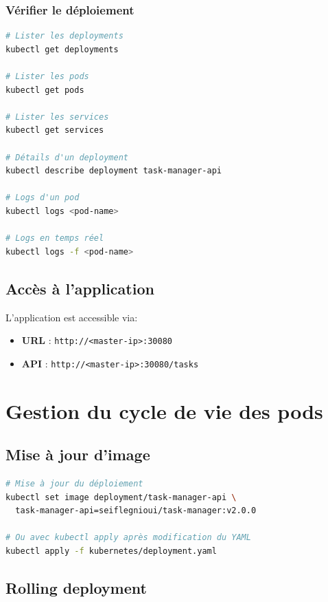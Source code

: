 \documentclass[12pt,a4paper,twoside]{report}
\begin{document}
\subsubsection{Vérifier le déploiement}

\begin{lstlisting}[language=bash]
# Lister les deployments
kubectl get deployments

# Lister les pods
kubectl get pods

# Lister les services
kubectl get services

# Détails d'un deployment
kubectl describe deployment task-manager-api

# Logs d'un pod
kubectl logs <pod-name>

# Logs en temps réel
kubectl logs -f <pod-name>
\end{lstlisting}

\subsection{Accès à l'application}

L'application est accessible via:
\begin{itemize}
    \item \textbf{URL} : \texttt{http://<master-ip>:30080}
    \item \textbf{API} : \texttt{http://<master-ip>:30080/tasks}
\end{itemize}

\section{Gestion du cycle de vie des pods}

\subsection{Mise à jour d'image}

\begin{lstlisting}[language=bash]
# Mise à jour du déploiement
kubectl set image deployment/task-manager-api \
  task-manager-api=seiflegnioui/task-manager:v2.0.0

# Ou avec kubectl apply après modification du YAML
kubectl apply -f kubernetes/deployment.yaml
\end{lstlisting}

\subsection{Rolling deployment}
\end{document}

